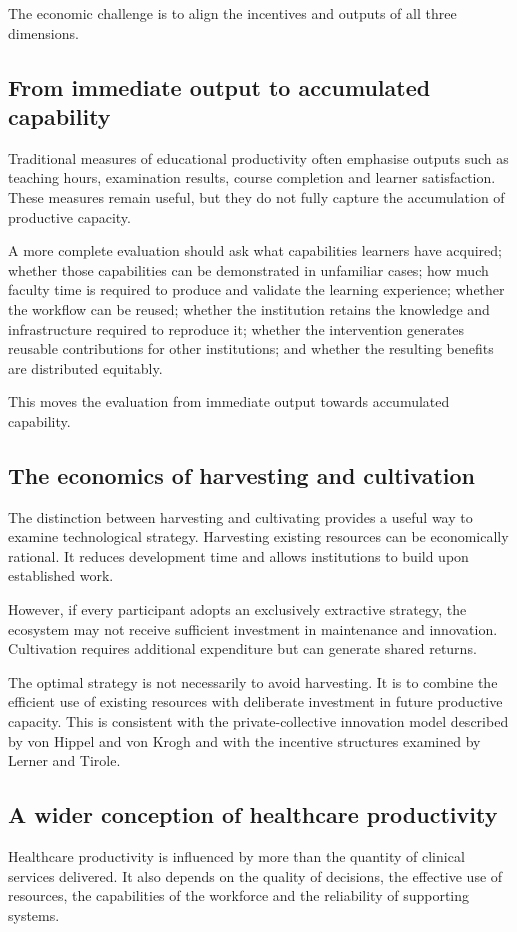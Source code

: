 \documentclass[11pt,a4paper]{article}
\begin{document}
The economic challenge is to align the incentives and outputs of all three dimensions.

\subsection{From immediate output to accumulated capability}
Traditional measures of educational productivity often emphasise outputs such as teaching hours, examination results, course completion and learner satisfaction. These measures remain useful, but they do not fully capture the accumulation of productive capacity.

A more complete evaluation should ask what capabilities learners have acquired; whether those capabilities can be demonstrated in unfamiliar cases; how much faculty time is required to produce and validate the learning experience; whether the workflow can be reused; whether the institution retains the knowledge and infrastructure required to reproduce it; whether the intervention generates reusable contributions for other institutions; and whether the resulting benefits are distributed equitably.

This moves the evaluation from immediate output towards accumulated capability.

\subsection{The economics of harvesting and cultivation}
The distinction between harvesting and cultivating provides a useful way to examine technological strategy. Harvesting existing resources can be economically rational. It reduces development time and allows institutions to build upon established work.

However, if every participant adopts an exclusively extractive strategy, the ecosystem may not receive sufficient investment in maintenance and innovation. Cultivation requires additional expenditure but can generate shared returns.

The optimal strategy is not necessarily to avoid harvesting. It is to combine the efficient use of existing resources with deliberate investment in future productive capacity. This is consistent with the private-collective innovation model described by von Hippel and von Krogh and with the incentive structures examined by Lerner and Tirole.

\subsection{A wider conception of healthcare productivity}
Healthcare productivity is influenced by more than the quantity of clinical services delivered. It also depends on the quality of decisions, the effective use of resources, the capabilities of the workforce and the reliability of supporting systems.
\end{document}
